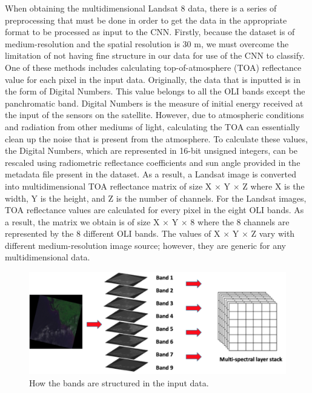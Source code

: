 \documentclass[letterpaper, 10 pt, conference]{ieeeconf}  %
\begin{document}
When obtaining the multidimensional Landsat 8 data, there is a series of preprocessing that must be done in order to get the data in the appropriate format to be processed as input to the CNN. Firstly, because the dataset is of medium-resolution and the spatial resolution is 30 m, we must overcome the limitation of not having fine structure in our data for use of the CNN to classify. One of these methods includes calculating top-of-atmosphere (TOA) reflectance value for each pixel in the input data. Originally, the data that is inputted is in the form of Digital Numbers. This value belongs to all the OLI bands except the panchromatic band. Digital Numbers is the measure of initial energy received at the input of the sensors on the satellite. However, due to atmospheric conditions and radiation from other mediums of light, calculating the TOA can essentially clean up the noise that is present from the atmosphere. To calculate these values, the Digital Numbers, which are represented in 16-bit unsigned integers, can be rescaled using radiometric reflectance coefficients and sun angle provided in the metadata file present in the dataset. As a result, a Landsat image is converted into multidimensional TOA reflectance matrix of size X $\times$ Y $\times$ Z where X is the width, Y is the height, and Z is the number of channels. For the Landsat images, TOA reflectance values are calculated for every pixel in the eight OLI bands. As a result, the matrix we obtain is of size X $\times$ Y $\times$ 8 where the 8 channels are represented by the 8 different OLI bands. The values of X $\times$ Y $\times$ Z vary with different medium-resolution image source; however, they are generic for any multidimensional data.

   \begin{figure}[thpb]
	\centering
	\includegraphics[scale=0.43]{preprocessing.png}
	\caption{How the bands are structured in the input data.}
	\label{figurelabel}
\end{figure}
\end{document}
